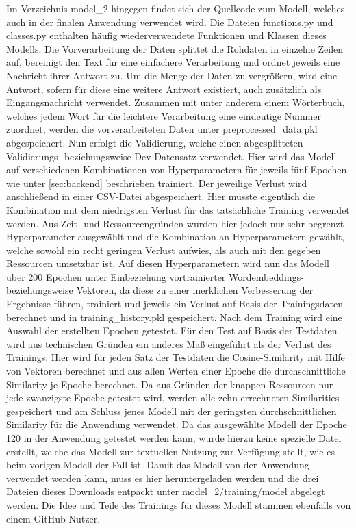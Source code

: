 \documentclass{aa}
\begin{document}
    Im Verzeichnis model\_2 hingegen findet sich der Quellcode zum Modell, welches auch in der finalen Anwendung verwendet wird. Die Dateien functions.py und classes.py enthalten häufig wiederverwendete Funktionen und Klassen dieses Modells. Die Vorverarbeitung der Daten splittet die Rohdaten in einzelne Zeilen auf, bereinigt den Text für eine einfachere Verarbeitung und ordnet jeweils eine Nachricht ihrer Antwort zu. Um die Menge der Daten zu vergrößern, wird eine Antwort, sofern für diese eine weitere Antwort existiert, auch zusätzlich als Eingangsnachricht verwendet. Zusammen mit unter anderem einem Wörterbuch, welches jedem Wort für die leichtere Verarbeitung eine eindeutige Nummer zuordnet, werden die vorverarbeiteten Daten unter preprocessed\_data.pkl abgespeichert. Nun erfolgt die Validierung, welche einen abgesplitteten Validierungs- beziehungsweise Dev-Datensatz verwendet. Hier wird das Modell auf verschiedenen Kombinationen von Hyperparametern für jeweils fünf Epochen, wie unter \ref{sec:backend} beschrieben trainiert. Der jeweilige Verlust wird anschließend in einer CSV-Datei abgespeichert. Hier müsste eigentlich die Kombination mit dem niedrigsten Verlust für das tatsächliche Training verwendet werden. Aus Zeit- und Ressourcengründen wurden hier jedoch nur sehr begrenzt Hyperparameter ausgewählt und die Kombination an Hyperparametern gewählt, welche sowohl ein recht geringen Verlust aufwies, als auch mit den gegeben Ressourcen umsetzbar ist. Auf diesen Hyperparametern wird nun das Modell über 200 Epochen unter Einbeziehung vortrainierter Wordembeddings- beziehungsweise Vektoren, da diese zu einer merklichen Verbesserung der Ergebnisse führen, trainiert und jeweils ein Verlust auf Basis der Trainingsdaten berechnet und in training\_history.pkl gespeichert. Nach dem Training wird eine Auswahl der erstellten Epochen getestet. Für den Test auf Basis der Testdaten wird aus technischen Gründen ein anderes Maß eingeführt als der Verlust des Trainings. Hier wird für jeden Satz der Testdaten die Cosine-Similarity mit Hilfe von Vektoren berechnet und aus allen Werten einer Epoche die durchschnittliche Similarity je Epoche berechnet. Da aus Gründen der knappen Ressourcen nur jede zwanzigste Epoche getestet wird, werden alle zehn errechneten Similarities gespeichert und am Schluss jenes Modell mit der geringsten durchschnittlichen Similarity für die Anwendung verwendet. Da das ausgewählte Modell der Epoche 120 in der Anwendung getestet werden kann, wurde hierzu keine spezielle Datei erstellt, welche das Modell zur textuellen Nutzung zur Verfügung stellt, wie es beim vorigen Modell der Fall ist. Damit das Modell von der Anwendung verwendet werden kann, muss es \href{https://drive.google.com/drive/folders/1qkqUJqsTw3lYPvoIKi1xJLhdjgPWzu9b?usp=sharing}{hier} heruntergeladen werden und die drei Dateien dieses Downloads entpackt unter model\_2/training/model abgelegt werden. Die Idee und Teile des Trainings für dieses Modell stammen ebenfalls von einem GitHub-Nutzer. \cite[Vgl.]{hasani}\\
\end{document}
